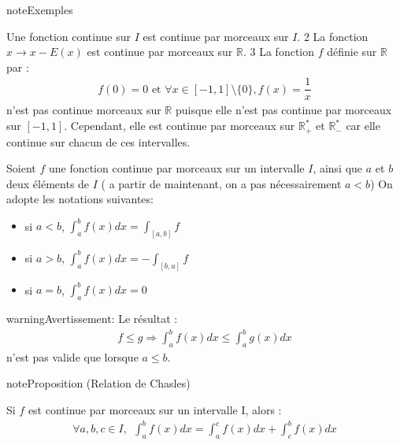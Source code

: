\documentclass[letterpaper,10pt,french]{jupyterBook}
\begin{document}
\begin{sphinxadmonition}{note}{Exemples}

\sphinxhyphen{} Une fonction continue sur \(I\) est continue par morceaux sur \(I\).
2\sphinxhyphen{} La fonction \( x \to x-E(x) \) est continue par morceaux sur \(\mathbb R\).
3\sphinxhyphen{} La fonction \(f\) définie sur \(\mathbb R\) par :
\begin{equation*}
\begin{split}f(0)=0 \mbox{  et  } \forall x \in [-1, 1] \setminus \{0\}, f(x)=\dfrac{1}{x}
\end{split}
\end{equation*}
\sphinxAtStartPar
n’est pas continue morceaux sur \(\mathbb R\) puisque elle n’est pas continue par morceaux sur \([-1, 1]\). Cependant, elle est continue par morceaux sur \(\mathbb R^*_+\) et \(\mathbb R^*_-\) car elle continue sur chacun de ces intervalles.
\end{sphinxadmonition}

\sphinxAtStartPar
{}

\sphinxAtStartPar
Soient \(f\) une fonction continue par morceaux sur un intervalle \(I\), ainsi que \(a\) et \(b\) deux éléments de \(I\) ( a partir de maintenant, on a pas nécessairement \(a<b\)) On adopte les notations suivantes:
\begin{itemize}
\item {} 
\sphinxAtStartPar
si \(a<b\), \(\int_a^b f(x)dx = \int_{[a,b]} f\)

\item {} 
\sphinxAtStartPar
si \(a>b\), \(\int_a^b f(x)dx = -\int_{[b,a]} f\)

\item {} 
\sphinxAtStartPar
si \(a = b\), \(\int_a^b f(x)dx =0\)

\end{itemize}

\begin{sphinxadmonition}{warning}{Avertissement:}
\sphinxAtStartPar
Le résultat :
\begin{equation*}
\begin{split}
f \leq g \Rightarrow \int_a^b f(x)dx \leq \int_a^b g(x)dx
\end{split}
\end{equation*}
\sphinxAtStartPar
n’est pas valide que lorsque \(a\leq b\).
\end{sphinxadmonition}

\begin{sphinxadmonition}{note}{Proposition (Relation de Chasles)}

\sphinxAtStartPar
Si \(f\) est continue par morceaux sur un intervalle I, alors :
\begin{equation*}
\begin{split}
\forall a, b, c \in I, ~~ \int_a^b f(x)dx = \int_a^c f(x)dx + \int_c^b f(x)dx
\end{split}
\end{equation*}\end{sphinxadmonition}
\end{document}
